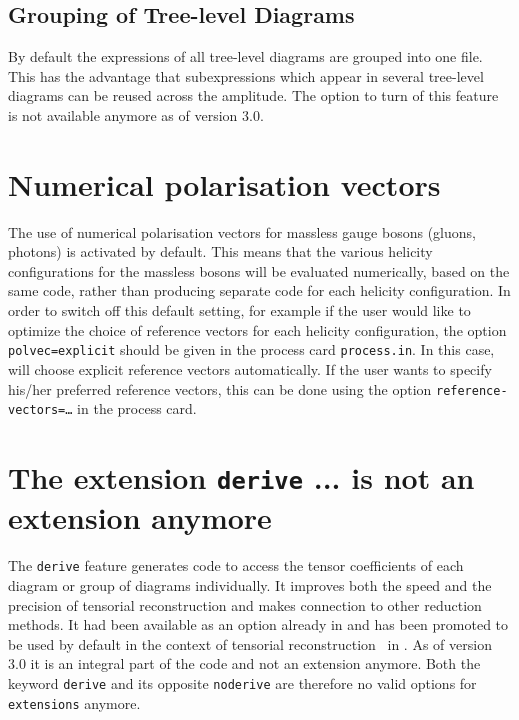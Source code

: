 \subsection*{Grouping of Tree-level Diagrams}

By default the expressions of all tree-level diagrams are grouped into one
file. This has the advantage that subexpressions which appear in several
tree-level diagrams can be reused across the amplitude. The option to turn of this feature is not available anymore as of version 3.0.

\section{Numerical polarisation vectors}
\label{sec:numpolvec}
The use of numerical polarisation vectors for massless gauge bosons
(gluons, photons) is activated by default.  This means that the
various helicity configurations for the massless bosons will be
evaluated numerically, based on the same code, rather than producing
separate code for each helicity configuration.  In order to switch off
this default setting,
for example if the user would like to 
optimize the choice of reference vectors for each helicity configuration,
the option \texttt{polvec=explicit} should be given in the process card 
\texttt{process.in}.
In this case, \gosam{} will choose explicit reference vectors automatically.
If the user wants to specify his/her preferred reference vectors, 
this can be done using the option \texttt{reference-vectors=\ldots}
in the process card.

\section{The extension \texttt{derive} ... is not an extension anymore}
\label{sec:derive}

The \texttt{derive} feature generates code to access the tensor coefficients
of each diagram or group of diagrams individually. It improves both the speed and the precision of tensorial reconstruction and makes connection to other reduction methods. It had been available as an option already in  and has been promoted to be used by default in the context of  tensorial reconstruction~\cite{Heinrich:2010ax} in . As of version 3.0 it is an integral part of the code and not an extension anymore. Both the keyword \texttt{derive} and its opposite \texttt{noderive} are therefore no valid options for \texttt{extensions} anymore.

